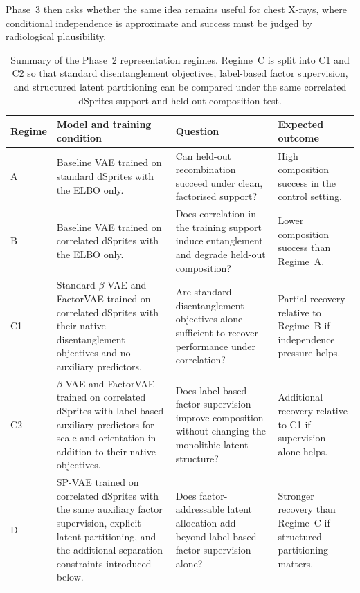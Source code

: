 Phase~3 then asks whether the same idea remains useful for chest X-rays, where
conditional independence is approximate and success must be judged by radiological plausibility.


\begin{table}[H]
    \centering
    \small
    \caption{Summary of the Phase~2 representation regimes. Regime~C is split into C1 and C2 so
    that standard disentanglement objectives, label-based factor supervision, and structured latent
    partitioning can be compared under the same correlated dSprites support and held-out
    composition test.}
    \label{tab:p2_representation_regimes}
    \begin{tabularx}{\linewidth}{|l|p{4.2cm}|X|X|}
        \hline
        Regime & Model and training condition & Question & Expected outcome \\
        \hline
        A & Baseline VAE trained on standard dSprites with the ELBO only. & Can held-out
        recombination succeed under clean, factorised support? & High composition success in the
        control setting. \\
        \hline
        B & Baseline VAE trained on correlated dSprites with the ELBO only. & Does correlation in
        the training support induce entanglement and degrade held-out composition? & Lower
        composition success than Regime~A. \\
        \hline
        C1 & Standard $\beta$-VAE and FactorVAE trained on correlated dSprites with their native
        disentanglement objectives and no auxiliary predictors. & Are standard disentanglement
        objectives alone sufficient to recover performance under correlation? & Partial recovery
        relative to Regime~B if independence pressure helps. \\
        \hline
        C2 & $\beta$-VAE and FactorVAE trained on correlated dSprites with label-based auxiliary
        predictors for scale and orientation in addition to their native objectives. & Does label-based factor supervision
        improve composition without changing the monolithic latent structure? & Additional recovery
        relative to C1 if supervision alone helps. \\
        \hline
        D & SP-VAE trained on correlated dSprites with the same auxiliary factor supervision, explicit
        latent partitioning, and the additional separation constraints introduced below. & Does
        factor-addressable latent allocation add beyond label-based factor supervision alone? & Stronger
        recovery than Regime~C if structured partitioning matters. \\
        \hline
    \end{tabularx}
\end{table}
